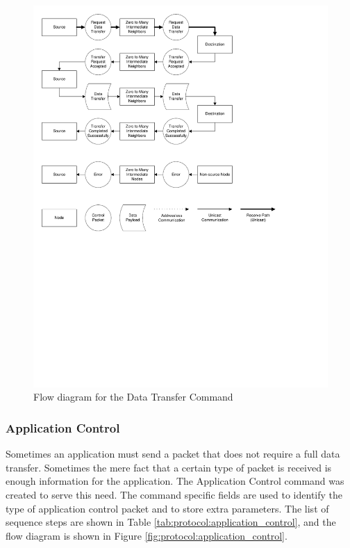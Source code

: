 \begin{figure}[ptb]
	\begin{centering}
		\includegraphics[scale=0.75]{Protocol/Figures/protocol-data_transfer.pdf}
		\caption{Flow diagram for the Data Transfer Command}
		\label{fig:protocol:data_transfer}
	\end{centering}
\end{figure}

\subsubsection{Application Control}\label{ref:protocol:methodology:commands:app_control}

Sometimes an application must send a packet that does not require a full data transfer. Sometimes the mere fact that a certain type of packet is received is enough information for the application. The Application Control command was created to serve this need. The command specific fields are used to identify the type of application control packet and to store extra parameters. The list of sequence steps are shown in Table \ref{tab:protocol:application_control}, and the flow diagram is shown in Figure \ref{fig:protocol:application_control}.

